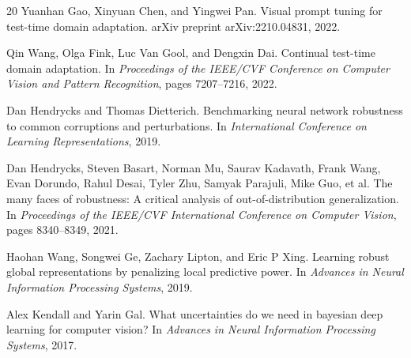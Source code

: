 \documentclass[11pt,a4paper]{article}
\begin{document}
\begin{thebibliography}{20}
Yuanhan Gao, Xinyuan Chen, and Yingwei Pan.
\newblock Visual prompt tuning for test-time domain adaptation.
\newblock arXiv preprint arXiv:2210.04831, 2022.

Qin Wang, Olga Fink, Luc Van Gool, and Dengxin Dai.
\newblock Continual test-time domain adaptation.
\newblock In \emph{Proceedings of the IEEE/CVF Conference on Computer Vision and Pattern Recognition}, pages 7207--7216, 2022.

Dan Hendrycks and Thomas Dietterich.
\newblock Benchmarking neural network robustness to common corruptions and perturbations.
\newblock In \emph{International Conference on Learning Representations}, 2019.

Dan Hendrycks, Steven Basart, Norman Mu, Saurav Kadavath, Frank Wang, Evan Dorundo, Rahul Desai, Tyler Zhu, Samyak Parajuli, Mike Guo, et al.
\newblock The many faces of robustness: A critical analysis of out-of-distribution generalization.
\newblock In \emph{Proceedings of the IEEE/CVF International Conference on Computer Vision}, pages 8340--8349, 2021.

Haohan Wang, Songwei Ge, Zachary Lipton, and Eric P Xing.
\newblock Learning robust global representations by penalizing local predictive power.
\newblock In \emph{Advances in Neural Information Processing Systems}, 2019.

Alex Kendall and Yarin Gal.
\newblock What uncertainties do we need in bayesian deep learning for computer vision?
\newblock In \emph{Advances in Neural Information Processing Systems}, 2017.

\end{thebibliography}
\end{document}
